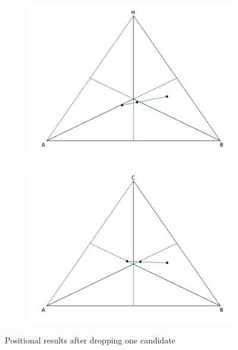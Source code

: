 \documentclass[hidelinks,11pt]{article} \usepackage[utf8]{inputenc}
\begin{document}
\begin{figure}[!h]
\begin{subfigure}[b]{0.475\textwidth}
\includegraphics[width=\textwidth]{./images/cw1_notc.png}
            \caption{}%
            \label{fig:notcc1}
        \end{subfigure} \hfill
        \begin{subfigure}[b]{0.475\textwidth} \centering
\includegraphics[width=\textwidth]{./images/cw1_noth.png}
             \caption{}%
            \label{fig:notah1}
        \end{subfigure}
        \caption[ Positional results when dropping one candidate ] {\small
Positional results after dropping one candidate }
        \label{fig:c1dropping}
    \end{figure}
\end{document}
